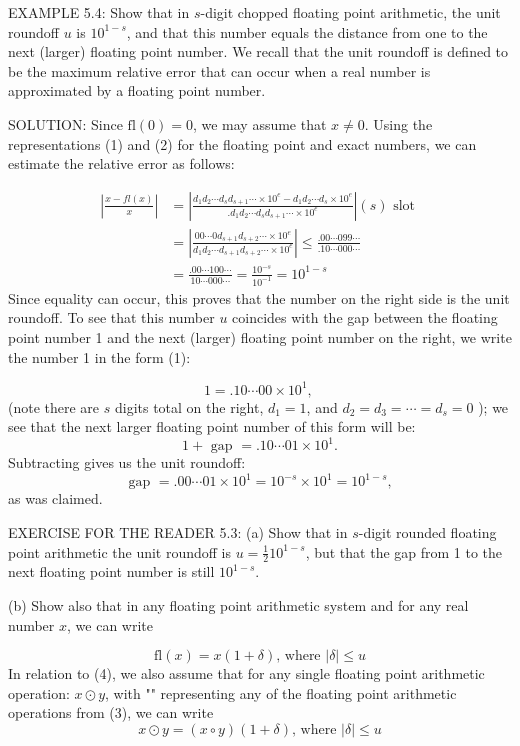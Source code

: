 \documentclass[../main.tex]{subfiles}
\begin{document}
EXAMPLE 5.4: Show that in $s$-digit chopped floating point arithmetic, the unit roundoff $u$ is $10^{1-s}$, and that this number equals the distance from one to the next (larger) floating point number. We recall that the unit roundoff is defined to be the maximum relative error that can occur when a real number is approximated by a floating point number.

SOLUTION: Since $\mathrm{fl}(0)=0$, we may assume that $x \neq 0$. Using the representations (1) and (2) for the floating point and exact numbers, we can estimate the relative error as follows:

$$
\begin{aligned}
\left|\frac{x-f l(x)}{x}\right| &=\left|\frac{d_{1} d_{2} \cdots d_{s} d_{s+1} \cdots \times 10^{e}-d_{1} d_{2} \cdots d_{s} \times 10^{e}}{. d_{1} d_{2} \cdots d_{s} d_{s+1} \cdots \times 10^{e}}\right|(s) \text { slot } \\
&=\left|\frac{00 \cdots 0 d_{s+1} d_{s+2} \cdots \times 10^{e}}{d_{1} d_{2} \cdots d_{s+1} d_{s+2} \cdots \times 10^{e}}\right| \leq \frac{.00 \cdots 099 \cdots}{.10 \cdots 000 \cdots} \\
&=\frac{.00 \cdots 100 \cdots}{10 \cdots 000 \cdots}=\frac{10^{-s}}{10^{-1}}=10^{1-s}
\end{aligned}
$$
Since equality can occur, this proves that the number on the right side is the unit roundoff. To see that this number $u$ coincides with the gap between the floating point number 1 and the next (larger) floating point number on the right, we write the number 1 in the form (1):

$$
1=.10 \cdots 00 \times 10^{1} \text {, }
$$
(note there are $s$ digits total on the right, $d_{1}=1$, and $d_{2}=d_{3}=\cdots=d_{s}=0$ ); we see that the next larger floating point number of this form will be:
$$
1+\text { gap }=.10 \cdots 01 \times 10^{1} .
$$
Subtracting gives us the unit roundoff:
$$
\text { gap }=.00 \cdots 01 \times 10^{1}=10^{-s} \times 10^{1}=10^{1-s} \text {, }
$$
as was claimed.


EXERCISE FOR THE READER 5.3: (a) Show that in $s$-digit rounded floating point arithmetic the unit roundoff is $u=\frac{1}{2} 10^{1-s}$, but that the gap from 1 to the next floating point number is still $10^{1-s}$.

(b) Show also that in any floating point arithmetic system and for any real number $x$, we can write

$$
\mathrm{fl}(x)=x(1+\delta) \text {, where }|\delta| \leq u
$$
In relation to (4), we also assume that for any single floating point arithmetic operation: $x \odot y$, with "" representing any of the floating point arithmetic operations from (3), we can write
$$
x \odot y=(x \circ y)(1+\delta) \text {, where }|\delta| \leq u
$$
\end{document}
